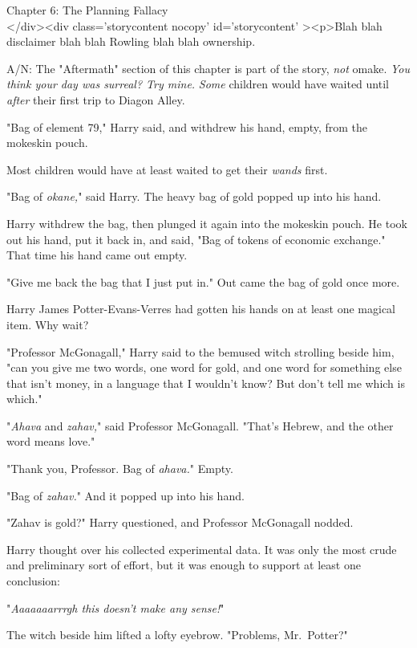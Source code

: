 
Chapter 6: The Planning Fallacy\\
</div><div  class='storycontent nocopy' id='storycontent' ><p>Blah blah 
disclaimer blah blah Rowling blah blah ownership.

A/N: The "Aftermath" section of this chapter is part of the story, \emph{not} 
omake.
\sbreak
\emph{You think your day was surreal? Try mine.}
\sbreak
\emph{Some} children would have waited until \emph{after} their first trip to 
Diagon Alley.

"Bag of element 79," Harry said, and withdrew his hand, empty, from the 
mokeskin pouch.

Most children would have at least waited to get their \emph{wands} first.

"Bag of \emph{okane,}" said Harry. The heavy bag of gold popped up into his 
hand.

Harry withdrew the bag, then plunged it again into the mokeskin pouch. He took 
out his hand, put it back in, and said, "Bag of tokens of economic exchange." 
That time his hand came out empty.

"Give me back the bag that I just put in." Out came the bag of gold once more.

Harry James Potter-Evans-Verres had gotten his hands on at least one magical 
item. Why wait?

"Professor McGonagall," Harry said to the bemused witch strolling beside him, 
"can you give me two words, one word for gold, and one word for something else 
that isn't money, in a language that I wouldn't know? But don't tell me which 
is which."

"\emph{Ahava} and \emph{zahav,}" said Professor McGonagall. "That's Hebrew, and 
the other word means love."

"Thank you, Professor. Bag of \emph{ahava.}" Empty.

"Bag of \emph{zahav.}" And it popped up into his hand.

"Zahav is gold?" Harry questioned, and Professor McGonagall nodded.

Harry thought over his collected experimental data. It was only the most crude 
and preliminary sort of effort, but it was enough to support at least one 
conclusion:

"\emph{Aaaaaaarrrgh this doesn't make any sense!}"

The witch beside him lifted a lofty eyebrow. "Problems, Mr.~Potter?"

